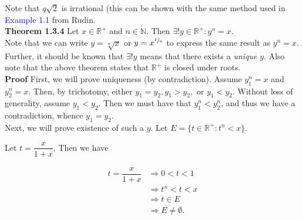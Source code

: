 \documentclass{article}
\begin{document}
Note that $q\sqrt{2}$ is irrational (this can be shown with the same method used in \textcolor{blue}{Example 1.1} from Rudin.\\

\textbf{Theorem 1.3.4} Let $x \in \mathbb{R}^+$ and $n \in \mathbb{N}$. Then $\exists ! y \in \mathbb{R}^+:y^n=x$.\\

Note that we can write $y=\sqrt[n]{x}$ or $y=x^{\sfrac{1}{n}}$ to express the same result as $y^n=x$. Further, it should be known that $\exists!y$ means that there exists a \textit{unique} $y$. Also note that the above theorem states that $\mathbb{R}^+$ is closed under roots.\\

\textbf{Proof} First, we will prove uniqueness (by contradiction). Assume $y_1^n=x$ and $y_2^n=x$. Then, by trichotomy, either $y_1=y_2, y_1>y_2,$ or $y_1<y_2$. Without loss of generality, assume $y_1<y_2$. Then we must have that $y_1^n<y_2^n$, and thus we have a contradiction, whence $y_1=y_2$.\\

Next, we will prove existence of such a $y$. Let $E=\{t \in \mathbb{R}^+:t^n<x\}$.\\


Let $t = \dfrac{x}{1+x}$. Then we have 

\begin{align*}
    t=\dfrac{x}{1+x} &\Longrightarrow 0<t<1\\
    &\Longrightarrow t^n<t<x \\
    &\Longrightarrow t \in E\\
    &\Longrightarrow E \neq \emptyset.
\end{align*}
\end{document}
